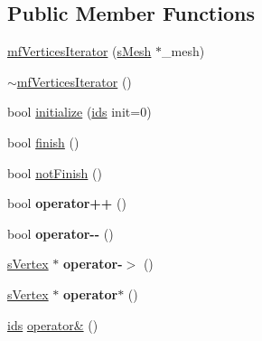 \subsection*{Public Member Functions}
\begin{DoxyCompactItemize}
\item 
\hyperlink{classmf_1_1mfVerticesIterator_a36cbafd47cdb27c54818973e05c00980}{mfVerticesIterator} (\hyperlink{classmf_1_1mfIterator_aca31e4d7e7eca4e3b100530d8725064b}{sMesh} $\ast$\_\-mesh)
\item 
\hyperlink{classmf_1_1mfVerticesIterator_a7de7fcdee6809c4857f0bccc02d7a4f8}{$\sim$mfVerticesIterator} ()
\item 
bool \hyperlink{classmf_1_1mfVerticesIterator_adde577253cf69727e98f913bc7659708}{initialize} (\hyperlink{classmf_1_1mfVerticesIterator_a4d1c60d2572a77d4d5080b78c12a85f9}{ids} init=0)
\item 
bool \hyperlink{classmf_1_1mfVerticesIterator_a28ce74d7e0a4eee32331385c0e45233f}{finish} ()
\item 
bool \hyperlink{classmf_1_1mfVerticesIterator_acccbff29ca7d53358a3f3d799e449e53}{notFinish} ()
\item 
\hypertarget{classmf_1_1mfVerticesIterator_a312576304811b3bc77b4f10a71c5c859}{
bool {\bfseries operator++} ()}
\label{classmf_1_1mfVerticesIterator_a312576304811b3bc77b4f10a71c5c859}

\item 
\hypertarget{classmf_1_1mfVerticesIterator_af1cc2b9f8aeb01f5b1563cbbe972af88}{
bool {\bfseries operator-\/-\/} ()}
\label{classmf_1_1mfVerticesIterator_af1cc2b9f8aeb01f5b1563cbbe972af88}

\item 
\hypertarget{classmf_1_1mfVerticesIterator_acd200563c161e01e67c425263c7c1f35}{
\hyperlink{classmf_1_1mfVerticesIterator_a123ec8591eb79091da3c80bd1a3e2eca}{sVertex} $\ast$ {\bfseries operator-\/$>$} ()}
\label{classmf_1_1mfVerticesIterator_acd200563c161e01e67c425263c7c1f35}

\item 
\hypertarget{classmf_1_1mfVerticesIterator_a6bcaaab59811acc32889a83e4b664e19}{
\hyperlink{classmf_1_1mfVerticesIterator_a123ec8591eb79091da3c80bd1a3e2eca}{sVertex} $\ast$ {\bfseries operator$\ast$} ()}
\label{classmf_1_1mfVerticesIterator_a6bcaaab59811acc32889a83e4b664e19}

\item 
\hyperlink{classmf_1_1mfVerticesIterator_a4d1c60d2572a77d4d5080b78c12a85f9}{ids} \hyperlink{classmf_1_1mfVerticesIterator_a21fd0fbb11a160d5754963f4de6e9b42}{operator\&} ()
\end{DoxyCompactItemize}
